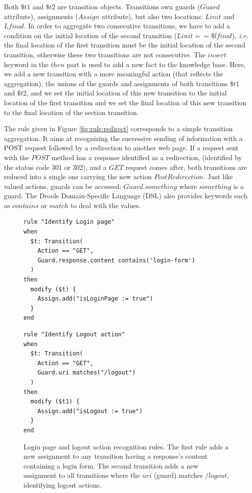 \begin{itemize}
Both $\$t1$ and $\$t2$ are transition objects. Transitions own
guards ($Guard$ attribute), assignments ($Assign$ attribute), but
also two locations: $Linit$ and $Lfinal$. In order to aggregate
two consecutive transitions, we have to add a condition on the
initial location of the second transition ($Linit == \$lfinal$),
\emph{i.e.} the final location of the first transition must be the
initial location of the second transition, otherwise these two
transitions are not consecutive. The $insert$ keyword in the
$then$ part is used to add a new fact to the knowledge base.
Here, we add a new transition with a more meaningful action (that
reflects the aggregation), the unions of the guards and
assignments of both transitions $\$t1$ and $\$t2$, and we set the
initial location of this new transition to the initial location
of the first transition and we set the final location of this new
transition to the final location of the section transition.

The rule given in Figure \ref{fig:rule:redirect} corresponds to a
simple transition aggregation. It aims at recognizing the
successive sending of information with a POST request followed by
a redirection to another web page.  If a request sent with the
$POST$ method has a response identified as a redirection,
(identified by the status code 301 or 302), and  a $GET$ request
comes after, both transitions are reduced into a single one
carrying the new action $PostRedirection$. Just like valued
actions, guards can be accessed: $Guard.something$ where
$something$ is a guard. The Drools Domain-Specific Language (DSL)
also provides keywords such as $contains$ or $match$ to deal with
the values.
\end{itemize}

\begin{figure}[h]
\begin{framed}
\begin{BVerbatim}
rule "Identify Login page"
when
  $t: Transition(
    Action == "GET",
    Guard.response.content contains('login-form')
  )
then
  modify ($t) {
    Assign.add("isLoginPage := true")
  }
end
\end{BVerbatim}
\end{framed}

\begin{framed}
\begin{BVerbatim}
rule "Identify Logout action"
when
  $t: Transition(
    Action == "GET",
    Guard.uri matches("/logout")
  )
then
  modify ($t1) {
    Assign.add("isLogout := true")
  }
end
\end{BVerbatim}
\end{framed}

    \caption{Login page and logout action recognition rules. The
    first rule adds a new assignment to any transition having a
    response's content containing a login form. The second
    transition adds a new assignment to all transitions where
    the $uri$ (guard) matches $/logout$, identifying logout
    actions.}
    \label{fig:rule:login}
\end{figure}

